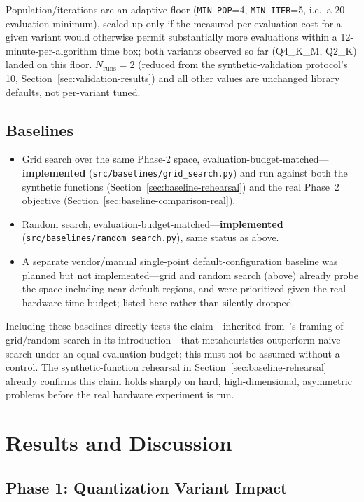 \documentclass[journal]{IEEEtran}
\begin{document}
Population/iterations are an adaptive floor (\texttt{MIN\_POP}=4, \texttt{MIN\_ITER}=5, i.e.\ a 20-evaluation minimum), scaled up only if the measured per-evaluation cost for a given variant would otherwise permit substantially more evaluations within a 12-minute-per-algorithm time box; both variants observed so far (Q4\_K\_M, Q2\_K) landed on this floor. $N_{\text{runs}}=2$ (reduced from the synthetic-validation protocol's 10, Section~\ref{sec:validation-results}) and all other values are unchanged library defaults, not per-variant tuned.

\subsection{Baselines}

\begin{itemize}
  \item Grid search over the same Phase-2 space, evaluation-budget-matched---\textbf{implemented} (\texttt{src/baselines/grid\_search.py}) and run against both the synthetic functions (Section~\ref{sec:baseline-rehearsal}) and the real Phase~2 objective (Section~\ref{sec:baseline-comparison-real}).
  \item Random search, evaluation-budget-matched---\textbf{implemented} (\texttt{src/baselines/random\_search.py}), same status as above.
  \item A separate vendor/manual single-point default-configuration baseline was planned but not implemented---grid and random search (above) already probe the space including near-default regions, and were prioritized given the real-hardware time budget; listed here rather than silently dropped.
\end{itemize}

Including these baselines directly tests the claim---inherited from~\cite{ref11}'s framing of grid/random search in its introduction---that metaheuristics outperform naive search under an equal evaluation budget; this must not be assumed without a control. The synthetic-function rehearsal in Section~\ref{sec:baseline-rehearsal} already confirms this claim holds sharply on hard, high-dimensional, asymmetric problems before the real hardware experiment is run.

\section{Results and Discussion}
\label{sec:results}


\subsection{Phase 1: Quantization Variant Impact}
\label{sec:phase1-results}
\end{document}
